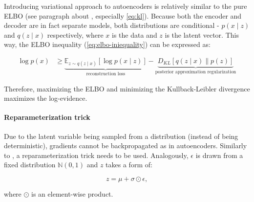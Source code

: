 \vspace{\baselineskip}
Introducing variational approach to autoencoders is relatively similar to the pure ELBO (see paragraph about , especially \autoref{eq:kl}). Because both the encoder and decoder are in fact separate models, both distributions are conditional - $p(x \mid z)$ and $q(z \mid x)$ respectively, where $x$ is the data and $z$ is the latent vector. This way, the ELBO inequality (\autoref{eq:elbo-iniequality}) can be expressed as:

\begin{equation}
    \begin{split}
        \log{p(x)} & \geq \underbrace{\mathbb{E}_{z \sim q(z \mid x)} \left[ \log{p(x \mid z)}\right]}_{\textrm{reconstruction loss}} - \underbrace{D_{KL} \left[q(z \mid x) \parallel p(z) \right]}_{\textrm{posterior approximation regularization}}
    \end{split}
\end{equation}

\noindent Therefore, maximizing the ELBO and minimizing the Kullback-Leibler divergence maximizes the log-evidence.


\paragraph{Reparameterization trick}
Due to the latent variable being sampled from a distribution (instead of being deterministic), gradients cannot be backpropagated as in autoencoders. Similarly to , a reparameterization trick needs to be used. Analogously, $\epsilon$ is drawn from a fixed distribution $\mathbb{N}(0, 1)$ and $z$ takes a form of:

\begin{equation}
    z = \mu + \sigma \odot \epsilon,
\end{equation}

\noindent where $\odot$ is an element-wise product.